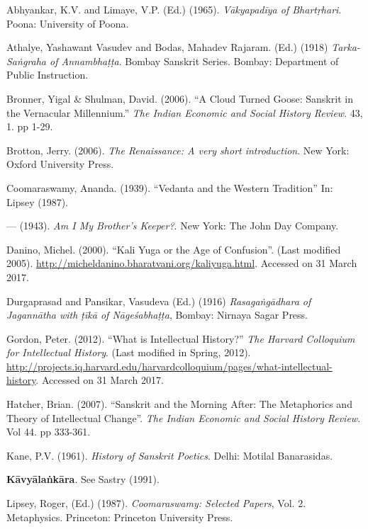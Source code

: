\begin{thebibliography}{99}
\itemsep=1pt
Abhyankar, K.V. and Limaye, V.P. (Ed.) (1965). {\sl Vākyapadīya of Bhartṛhari}. Poona: University of Poona.

 Athalye, Yashawant Vasudev and Bodas, Mahadev Rajaram. (Ed.) (1918) {\sl Tarka-Saṅgraha of Annambhaṭṭa}. Bombay Sanskrit Series. Bombay: Department of Public Instruction. 

 Bronner, Yigal \& Shulman, David. (2006). “A Cloud Turned Goose: Sanskrit in the Vernacular Millennium.” {\sl The Indian Economic and Social History Review}. 43, 1. pp 1-29.

Brotton, Jerry. (2006). {\sl The Renaissance: A very short introduction}. New York: Oxford University Press. 

Coomaraswamy, Ananda. (1939). ``Vedanta and the Western Tradition'' In: Lipsey (1987).

--- (1943). {\sl Am I My Brother’s Keeper?}. New York: The John Day Company. 

Danino, Michel. (2000). “Kali Yuga or the Age of Confusion”. (Last modified 2005). \url{http://micheldanino.bharatvani.org/kaliyuga.html}. Accessed on 31 March 2017.

Durgaprasad and Pansikar, Vasudeva (Ed.) (1916) {\sl Rasagaṅgādhara of Jagannātha with ṭīkā of Nāgeśabhaṭṭa}, Bombay: Nirnaya Sagar Press. 

Gordon, Peter. (2012). “What is Intellectual History?” {\sl The Harvard Colloquium for Intellectual History}. (Last modified in Spring, 2012). \url{http://projects.iq.harvard.edu/harvardcolloquium/pages/what-intellectual-history}. Accessed on 31 March 2017. 

 Hatcher, Brian. (2007). “Sanskrit and the Morning After: The Metaphorics and Theory of Intellectual Change”. {\sl The Indian Economic and Social History Review}. Vol 44. pp 333-361. 

 Kane, P.V. (1961). {\sl History of Sanskrit Poetics}.  Delhi: Motilal Banarasidas. 

{\bf Kāvyālaṅkāra}. See Sastry (1991).

 Lipsey, Roger, (Ed.) (1987). {\sl Coomaraswamy: Selected Papers}, Vol. 2. Metaphysics. Princeton: Princeton University Press. 


\end{thebibliography}
